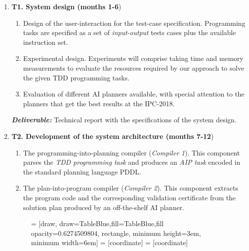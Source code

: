 \documentclass[10pt,a4paper]{paper}
\begin{document}
\begin{enumerate}
\item {\bf T1. System design (months 1-6})
  \begin{small}
    \begin{enumerate}
    \item Design of the user-interaction for the test-case specification. Programming tasks are specified as a set of {\em input-output} tests cases plus the available instruction set. 
    \item Experimental design. Experiments will comprise taking time and memory measurements to evaluate the resources required by our approach to solve the given TDD programming tasks.
      \item Evaluation of different AI planners available, with special attention to the planners that get the best results at the IPC-2018. 
      \end{enumerate}
  \end{small}

{\small{\bf\em  Deliverable:} Technical report with the specifications of the system design.}
  
  \item {\bf T2. Development of the system architecture (months 7-12})
    \begin{small}
      \begin{enumerate}
      \item The programming-into-planning compiler ({\em Compiler 1}). This component parses the {\em TDD programming task} and produces an {\em AIP task} encoded in the standard planning language PDDL.
      \item The plan-into-program compiler ({\em Compiler 2}). This component extracts the program code and the corresponding validation certificate from the solution plan produced by an off-the-shelf AI planner.
      \end{enumerate}
\end{small}      

\begin{figure}[hbt!]
 = [draw, draw=TableBlue,fill=TableBlue,fill opacity=0.6274509804, rectangle, minimum height=3em, minimum width=6em]
 = [coordinate]
 = [coordinate]
\begin{center}
\end{center}
\end{figure}
\end{enumerate}
\end{document}
